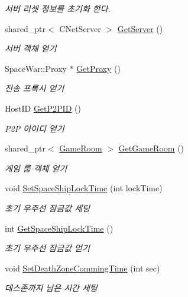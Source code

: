 \begin{DoxyCompactItemize}
\begin{DoxyCompactList}\small\item\em 서버 리셋 정보를 초기화 한다. \end{DoxyCompactList}\item 
shared\+\_\+ptr$<$ C\+Net\+Server $>$ \hyperlink{class_server_a044bc662d96361b3bda25230533ec63b}{Get\+Server} ()
\begin{DoxyCompactList}\small\item\em 서버 객체 얻기 \end{DoxyCompactList}\item 
Space\+War\+::\+Proxy $\ast$ \hyperlink{class_server_ae62a9437703d205c2d02737dfce45a33}{Get\+Proxy} ()
\begin{DoxyCompactList}\small\item\em 전송 프록시 얻기 \end{DoxyCompactList}\item 
Host\+ID \hyperlink{class_server_ac6e03fa95f91583bd117f4910257b7be}{Get\+P2\+P\+ID} ()
\begin{DoxyCompactList}\small\item\em P2P 아이디 얻기 \end{DoxyCompactList}\item 
shared\+\_\+ptr$<$ \hyperlink{class_game_room}{Game\+Room} $>$ \hyperlink{class_server_ab5d6fa91446df16909dfbea64abddf76}{Get\+Game\+Room} ()
\begin{DoxyCompactList}\small\item\em 게임 룸 객체 얻기 \end{DoxyCompactList}\item 
void \hyperlink{class_server_a3866f3d6a99358d0068cee3d5bc529d2}{Set\+Space\+Ship\+Lock\+Time} (int lock\+Time)
\begin{DoxyCompactList}\small\item\em 초기 우주선 잠금값 세팅 \end{DoxyCompactList}\item 
int \hyperlink{class_server_a4ad8b199648bad8ea03b9e161b1bcb10}{Get\+Space\+Ship\+Lock\+Time} ()
\begin{DoxyCompactList}\small\item\em 초기 우주선 잠금값 얻기 \end{DoxyCompactList}\item 
void \hyperlink{class_server_a0c817a017f9b2cb6f92de01e693b8e35}{Set\+Death\+Zone\+Comming\+Time} (int sec)
\begin{DoxyCompactList}\small\item\em 데스존까지 남은 시간 세팅 \end{DoxyCompactList}\item 

\end{DoxyCompactItemize}
